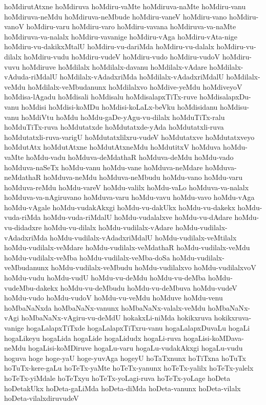 {hoMdirutAtxne
hoMdiruva
hoMdiru-vaMte
hoMdiruva-naMte
hoMdiru-vanu
hoMdiruva-neMdu
hoMdiruva-neMbude
hoMdiru-vaneV
hoMdiru-vano
hoMdiru-vanoV
hoMdiru-varu
hoMdiru-varo
hoMdiru-vavana
hoMdiruva-va-naMte
hoMdiruva-va-nalalx
hoMdiru-vavanige
hoMdiru-vAga
hoMdiru-vAta-nige
hoMdiru-vu-dakikxMtalU
hoMdiru-vu-dariMda
hoMdiru-vu-dalalx
hoMdiru-vu-dilalx
hoMdiru-vudu
hoMdiru-vudeV
hoMdiru-vudo
hoMdiru-vudoV
hoMdiru-vuvu
hoMdiruve
hoMdilalx
hoMdilalx-davanu
hoMdilalx-vAdare
hoMdilalx-vAduda-riMdalU
hoMdilalx-vAdadxriMda
hoMdilalx-vAdadxriMdalU
hoMdilalx-veMdu
hoMdilalx-veMbudanunx
hoMdilalxvo
hoMdive-yeMdu
hoMdiveyoV
hoMdisa-lAgadu
hoMdisali
hoMdisalu
hoMdisalapxTiTx-ruve
hoMdisalapxDu-vanu
hoMdisi
hoMdisi-koMDu
hoMdisi-koLaLx-beVku
hoMdisidanu
hoMdisu-vanu
hoMdiVtu
hoMdu
hoMdu-gaDe-yAgu-vu-dilalx
hoMduTiTx-ralu
hoMduTiTx-ruva
hoMdutatxde
hoMdutatxde-yAda
hoMdutatxli-ruva
hoMdutatxli-ruva-varigU
hoMdutatxlilxru-vudeV
hoMdutatxve
hoMdutatxveyo
hoMdutAtx
hoMdutAtxne
hoMdutAtxneMdu
hoMdutitxV
hoMduva
hoMdu-vaMte
hoMdu-vadu
hoMduva-deMdathaR
hoMduva-deMdu
hoMdu-vado
hoMduva-naSeTx
hoMdu-vanu
hoMdu-vane
hoMduva-neMdare
hoMduva-neMdathaR
hoMduva-neMdu
hoMduva-neMbudu
hoMdu-vano
hoMdu-varu
hoMduva-reMdu
hoMdu-vareV
hoMdu-valilx
hoMdu-vaLo
hoMduva-va-nalalx
hoMduva-va-nAgiruvano
hoMduva-varu
hoMdu-vavu
hoMdu-vavo
hoMdu-vAga
hoMdu-vAgale
hoMdu-vudakAkxgi
hoMdu-vu-dakUkx
hoMdu-vu-dakekx
hoMdu-vuda-riMda
hoMdu-vuda-riMdalU
hoMdu-vudalalxve
hoMdu-vu-dAdare
hoMdu-vu-didadxre
hoMdu-vu-dilalx
hoMdu-vudilalx-vAdare
hoMdu-vudilalx-vAdadxriMda
hoMdu-vudilalx-vAdadxriMdalU
hoMdu-vudilalx-veMtilalx
hoMdu-vudilalx-veMdare
hoMdu-vudilalx-veMdathaR
hoMdu-vudilalx-veMdu
hoMdu-vudilalx-veMba
hoMdu-vudilalx-veMba-doSa
hoMdu-vudilalx-veMbudanunx
hoMdu-vudilalx-veMbudu
hoMdu-vudilalxvo
hoMdu-vudilalxvoV
hoMdu-vudu
hoMdu-vudU
hoMdu-vu-deMdu
hoMdu-vu-deMba
hoMdu-vudeMbu-dakekx
hoMdu-vu-deMbudu
hoMdu-vu-deMbuva
hoMdu-vudeV
hoMdu-vudo
hoMdu-vudoV
hoMdu-vu-veMdu
hoMduve
hoMdu-venu
hoMbaNaNxda
hoMbaNaNx-vanunx
hoMbaNaNx-valalx-veMdu
hoMbaNaNx-vAgi
hoMbaNaNx-vAgiru-vu-deMdU
hokakxLi-niMda
hokikxruva
hokikxruva-vanige
hogaLalapxTiTxde
hogaLalapxTiTxru-vanu
hogaLalapxDuvaLu
hogaLi
hogaLikeyu
hogaLida
hogaLide
hogaLidudx
hogaLi-ruva
hogaLisi-koMDava-neMdu
hogaLisi-koMDiruve
hogaLu-varu
hogaLu-vudakAkxgi
hogaLu-vudu
hoguva
hoge
hoge-yaU
hoge-yuvAga
hogeyU
hoTaTxnunx
hoTiTxna
hoTuTx
hoTuTx-kere-gaLu
hoTeTx-yaMte
hoTeTx-yanunx
hoTeTx-yalilx
hoTeTx-yalelx
hoTeTx-yiMdale
hoTeTxyu
hoTeTx-yoLagi-ruva
hoTeTx-yoLage
hoDeta
hoDetakUkx
hoDeta-gaLiMda
hoDeta-diMda
hoDeta-vanunx
hoDeta-vilalx
hoDeta-vilalxdiruvudeV
}
